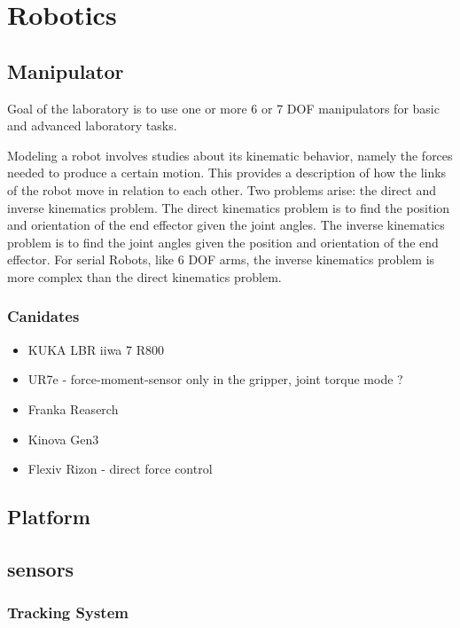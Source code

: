 \documentclass{ltxdockit}
\begin{document}
\section{Robotics}
\label{sec:robotics}

\subsection{Manipulator}
\label{sec:robotics:manipulator}

Goal of the laboratory is to use one or more 6 or 7 DOF manipulators for basic and advanced laboratory tasks. 

Modeling a robot involves studies about its kinematic behavior, namely the forces needed to produce a certain motion. This provides a description of how the links of the robot move in relation to each other. Two problems arise: the direct and inverse kinematics problem. The direct kinematics problem is to find the position and orientation of the end effector given the joint angles. The inverse kinematics problem is to find the joint angles given the position and orientation of the end effector. For serial Robots, like 6 DOF arms, the inverse kinematics problem is more complex than the direct kinematics problem. 

\subsubsection{Canidates}
\begin{itemize}
  \item KUKA LBR iiwa 7 R800
  \item UR7e - force-moment-sensor only in the gripper, joint torque mode ?
  \item Franka Reaserch 
  \item Kinova Gen3
  \item Flexiv Rizon - direct force control
\end{itemize}

\subsection{Platform}
\label{sec:robotics:platform}

\subsection{sensors}
\label{sec:robotics:sensor}

\subsubsection{Tracking System}
\label{sec:robotics:sensor:tracking_system}
\end{document}
